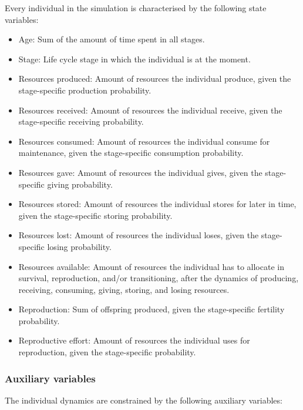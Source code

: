 \documentclass{article}
\begin{document}
Every individual in the simulation is characterised by the following state variables:

\begin{itemize}
    \item Age: Sum of the amount of time spent in all stages.
    \item Stage: Life cycle stage in which the individual is at the moment.
    \item Resources produced: Amount of resources the individual produce, given the stage-specific production probability.
    \item Resources received: Amount of resources the individual receive, given the stage-specific receiving probability.
    \item Resources consumed: Amount of resources the individual consume for maintenance, given the stage-specific consumption probability.
    \item Resources gave: Amount of resources the individual gives, given the stage-specific giving probability.
    \item Resources stored: Amount of resources the individual stores for later in time, given the stage-specific storing probability.
    \item Resources lost: Amount of resources the individual loses, given the stage-specific losing probability.
    \item Resources available: Amount of resources the individual has to allocate in survival, reproduction, and/or transitioning, after the dynamics of producing, receiving, consuming, giving, storing, and losing resources.
    \item Reproduction: Sum of offspring produced, given the stage-specific fertility probability.
    \item Reproductive effort: Amount of resources the individual uses for reproduction, given the stage-specific probability.
\end{itemize}

\subsubsection{Auxiliary variables}

The individual dynamics are constrained by the following auxiliary variables:
\end{document}

